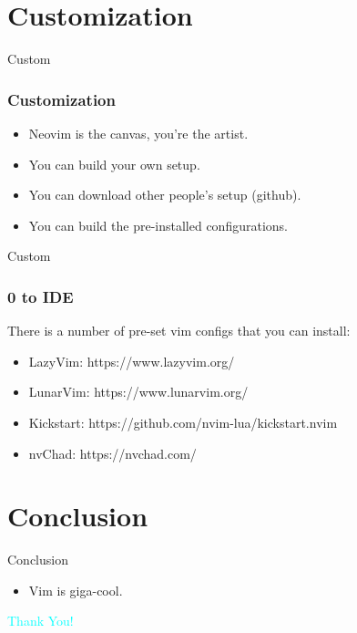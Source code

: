 \documentclass{beamer}
\begin{document}
\section{Customization}
\begin{frame}{Custom}
    \frametitle{Customization}
    \begin{itemize}
        \item Neovim is the canvas, you're the artist.
        \item You can build your own setup.
        \item You can download other people's setup (github).
        \item You can build the pre-installed configurations.
    \end{itemize}
\end{frame}

\begin{frame}{Custom}
    \frametitle{0 to IDE}
    There is a number of pre-set vim configs that you can install:
    \begin{itemize}
        \item LazyVim: https://www.lazyvim.org/ 
        \item LunarVim: https://www.lunarvim.org/
        \item Kickstart: https://github.com/nvim-lua/kickstart.nvim
        \item nvChad: https://nvchad.com/
    \end{itemize}
\end{frame}

\section{Conclusion}
\begin{frame}{Conclusion}
    \begin{itemize}
        \item Vim is giga-cool.
    \end{itemize}
\end{frame}

\begin{frame}
    \centering
    {\Huge \textcolor{cyan}{Thank You!}}
\end{frame}
\end{document}
